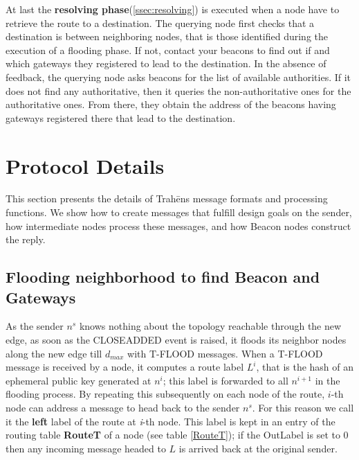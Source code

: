 \documentclass[12pt,oneside]{wlscirep}
\newcommand{\ProtoName}{Trah\={e}ns }
\begin{document}
At last the \textbf{resolving phase}(\ref{ssec:resolving}) is executed when a node have to retrieve the route to a destination. The querying node first checks that a destination is between neighboring nodes, that is those identified during the execution of a flooding phase. If not, contact your beacons to find out if and which gateways they registered to lead to the destination. In the absence of feedback, the querying node asks beacons for the list of available authorities. If it does not find any authoritative, then it queries the non-authoritative ones for the authoritative ones. From there, they obtain the address of the beacons having gateways registered there that lead to the destination.\par








\clearpage
\section{Protocol Details}
\label{sec:details}
This section presents the details of \ProtoName  message formats and processing functions. We show how to create messages that fulfill design goals on the sender, how intermediate nodes process these messages, and how Beacon nodes construct the reply.




\subsection{Flooding neighborhood to find Beacon and Gateways}
\label{ssec:flooding}
As the sender $n^s$ knows nothing about the topology reachable through the new edge, as soon as the CLOSEADDED event is raised, it floods its neighbor nodes along the new edge till $d_{max}$ with T-FLOOD messages.  When a T-FLOOD message is received by a node, it computes a route label $L^i$, that is the hash of an ephemeral public key generated at $n^i$; this label is forwarded to all $n^{i+1}$ in the flooding process. By repeating this subsequently on each node of the route, $i$-th node can address a message to head back to the sender $n^s$. For this reason we call it the \textbf{left} label of the route at \textit{i}-th node. This label is kept in an entry of the routing table \textbf{RouteT} of a node (see table \ref{RouteT}); if the OutLabel is set to 0 then any incoming message headed to $L$ is arrived back at the original sender.\par
\end{document}
